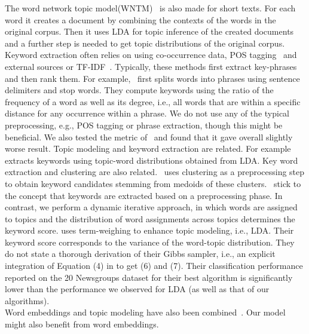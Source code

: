 \documentclass[twocolumn,10]{article}
\newcommand{\ci}{~\cite} \newcommand{\re}{~\ref} \newcommand{\ma}{\mathbb}
\begin{document}
	The word network topic model(WNTM)\ci{zuo16} is also made for short texts. For each word it creates a document by combining the contexts of the words in the original corpus. Then it uses LDA for topic inference of the created documents and a further step is needed to get topic distributions of the original corpus.\\ 
	Keyword extraction often relies on using co-occurrence data, POS tagging\ci{ros10} and external sources or TF-IDF\ci{has14}. Typically, these methods first extract key-phrases and then rank them. For example,\ci{ros10} first splits words into phrases using sentence delimiters and stop words. They compute keywords using the ratio of the frequency of a word as well as its degree, i.e., all words that are within a specific distance for any occurrence within a phrase. We do not use any of the typical preprocessing, e.g., POS tagging or phrase extraction, though this might be beneficial. We also tested the metric of\ci{ros10} and found that it gave overall slightly worse result.
	Topic modeling and keyword extraction are related. For example \ci{liu10} extracts keywords using topic-word distributions obtained from LDA. Key word extraction and clustering are also related.\ci{liu09} uses clustering as a preprocessing step to obtain keyword candidates stemming from medoids of these clusters.\ci{liu09,liu10} stick to the concept that keywords are extracted based on a preprocessing phase. In contrast, we perform a dynamic iterative approach, in which words are assigned to topics and the distribution of word assignments across topics determines the keyword score. \cite{lee15} uses term-weighing to enhance topic modeling, i.e., LDA. Their keyword score corresponds to the variance of the word-topic distribution. They do not state a thorough derivation of their Gibbs sampler, i.e., an explicit integration of Equation (4) in \cite{lee15} to get (6) and (7). Their classification performance reported on the 20 Newsgroups dataset for their best algorithm is significantly lower than the performance we observed for LDA (as well as that of our algorithms).\\
	Word embeddings and topic modeling have also been combined\ci{das15,lis16}. Our model might also benefit from word embeddings.
\end{document}
